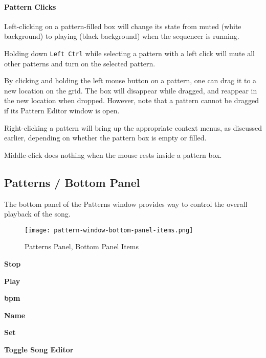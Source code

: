 \paragraph{Pattern Clicks}
\label{paragraph:seq24_patterns_pattern_Clicks}

   Left-clicking on a pattern-filled box will change its state
   from muted (white background) to playing (black background) when
   the sequencer is running.

   Holding down \texttt{Left Ctrl} while selecting a pattern
   with a left click will mute all other patterns and turn on the selected
   pattern.

   By clicking and holding the left mouse button on a pattern,
   one can drag it to a new location on the grid.  The box
   will disappear while dragged, and reappear in the new location when
   dropped.  However, note that a pattern cannot be dragged if its
   Pattern Editor window is open.

   Right-clicking a pattern will bring up the appropriate context menus, as
   discussed earlier, depending on whether the pattern box is empty or
   filled.

   Middle-click does nothing when the mouse rests inside a pattern box.

\subsection{Patterns / Bottom Panel}
\label{subsec:seq24_patterns_panel_bottom}

   The bottom panel of the Patterns window provides way to control the
   overall playback of the song.

\begin{figure}[H]
   \centering 
   \texttt{[image: pattern-window-bottom-panel-items.png]}
   \caption{Patterns Panel, Bottom Panel Items}
   \label{fig:pattern_window_bottom_panel_items}
\end{figure}

   \begin{enumber}
      \item \textbf{Stop}
      \item \textbf{Play}
      \item \textbf{bpm}
      \item \textbf{Name}
      \item \textbf{Set}
      \item \textbf{Toggle Song Editor}
   \end{enumber}

